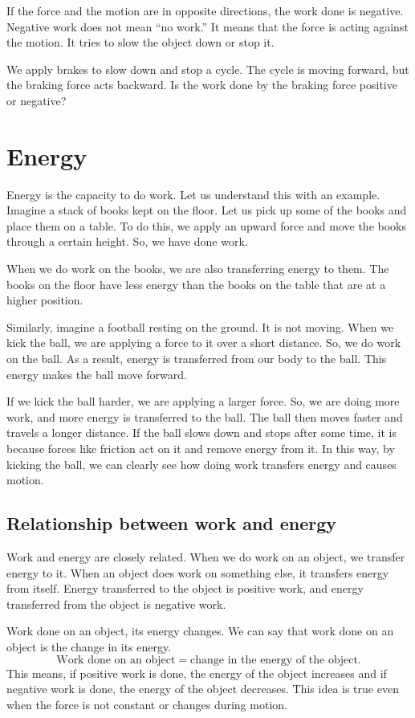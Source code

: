 \documentclass{xtufte-handout}
\begin{document}
If the force and the motion are in opposite directions, the work done is negative. Negative work does not mean “no work.” It means that the force is acting against the motion. It tries to slow the object down or stop it.

 We apply brakes to slow down and stop a cycle. The cycle is moving forward, but the braking force acts backward. Is the work done by the braking force positive or negative?

\section{Energy}
Energy is the capacity to do work. Let us understand this with an example. Imagine a stack of books kept on the floor. Let us pick up some of the books and place them on a table. To do this, we apply an upward force and move the books through a certain height. So, we have done work.

When we do work on the books, we are also transferring energy to them. The books on the floor have less energy than the books on the table that are at a higher position.

Similarly, imagine a football resting on the ground. It is not moving. When we kick the ball, we are applying a force to it over a short distance. So, we do work on the ball. As a result, energy is transferred from our body to the ball. This energy makes the ball move forward.

If we kick the ball harder, we are applying a larger force. So, we are doing more work, and more energy is transferred to the ball. The ball then moves faster and travels a longer distance. If the ball slows down and stops after some time, it is because forces like friction act on it and remove energy from it. In this way, by kicking the ball, we can clearly see how doing work transfers energy and causes motion.

\subsection{Relationship between work and energy}
Work and energy are closely related. When we do work on an object, we transfer energy to it. When an object does work on something else, it transfers energy from itself. Energy transferred to the object is positive work, and energy transferred from the object is negative work.

Work done on an object, its energy changes. We can say that work done on an object is the change in its energy. 
\begin{equation}
  \text{Work done on an object} = \text{change in the energy of the object}.  
\end{equation}
This means, if positive work is done, the energy of the object increases and if negative work is done, the energy of the object decreases. This idea is true even when the force is not constant or changes during motion.
\end{document}
